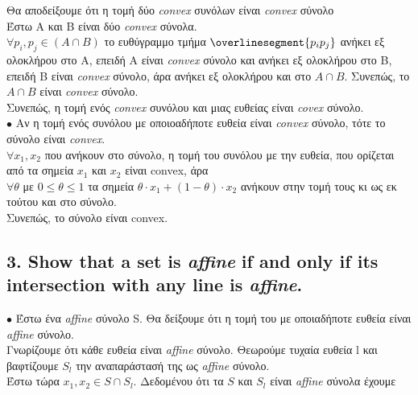 \documentclass[12pt]{article}
\begin{document}
Θα αποδείξουμε ότι η τομή δύο \textit{convex} συνόλων είναι \textit{convex} σύνολο \\

Έστω Α και Β είναι δύο \textit{convex} σύνολα. \\

$\forall p_i, p_j \in (A \cap B)$ το ευθύγραμμο τμήμα $\overlinesegment{p_{i}p_{j}}$ ανήκει εξ ολοκλήρου στο Α, 
επειδή Α είναι \textit{convex} σύνολο και ανήκει εξ ολοκλήρου στο Β, 
επειδή Β είναι \textit{convex} σύνολο, 
άρα ανήκει εξ ολοκλήρου και στο $Α \cap Β$. 
Συνεπώς, το $Α \cap Β$ είναι \textit{convex} σύνολο. \\

Συνεπώς, η τομή ενός \textit{convex} συνόλου και μιας ευθείας είναι \textit{covex} σύνολο. \\

$\bullet$ Aν η τομή ενός συνόλου με οποιοαδήποτε ευθεία είναι \textit{convex} σύνολο, 
τότε το σύνολο είναι \textit{convex}. \\

$\forall x_1, x_2$ που ανήκουν στο σύνολο, η τομή του συνόλου με την ευθεία, 
που ορίζεται από τα  σημεία $x_1$ και $x_2$ είναι convex, άρα \\

$\forall \theta$ με $0 \leq \theta \leq 1$ τα σημεία 
$\theta \cdot x_1 + (1 - \theta) \cdot x_2$ ανήκουν στην τομή τους 
κι ως εκ τούτου και στο σύνολο. \\

Συνεπώς, το σύνολο είναι convex.

\vspace{2in} %

\pagebreak

\subsection*{3. Show that a set is \textit{affine} if and only if its intersection with any line is \textit{affine}.}

$\bullet$ Έστω ένα \textit{affine} σύνολο S. Θα δείξουμε ότι η τομή του με οποιαδήποτε ευθεία είναι \textit{affine} σύνολο.\\

Γνωρίζουμε ότι κάθε ευθεία είναι \textit{affine} σύνολο.
Θεωρούμε τυχαία ευθεία l και βαφτίζουμε $S_l$ την αναπαράστασή της ως \textit{affine} σύνολο.\\

Έστω τώρα $x_1, x_2 \in S \cap S_l$.
Δεδομένου ότι τα $S$ και $S_l$ είναι \textit{affine} σύνολα έχουμε\\
\end{document}
